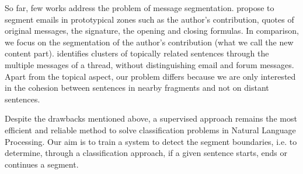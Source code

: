 So far, few works address the problem of message segmentation.
\cite{lampert:2009:emnlp} propose to segment emails in prototypical zones such as the author's contribution, quotes of original messages, the signature, the opening and closing formulas. 
In comparison, we focus on the segmentation of the author's contribution (what we call the new content part).
\cite{joty:2013:jair} identifies %
clusters of topically related sentences through the multiple messages of a thread, without distinguishing email and forum messages. Apart from the topical aspect, our problem differs because we are only interested in the cohesion between sentences in nearby fragments and %
 not on distant sentences.


Despite the drawbacks mentioned above, a supervised approach remains %
the most efficient and reliable method to solve classification problems in Natural Language Processing. 
% 
Our aim is to train a system to detect the segment boundaries, %
i.e. to determine, through a classification approach, if a given sentence starts, ends or continues a segment.

